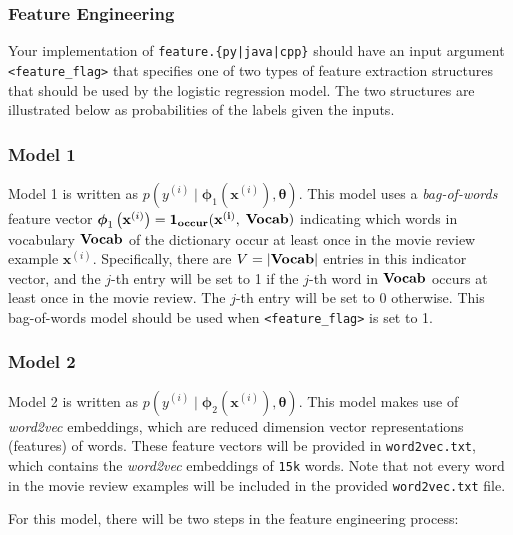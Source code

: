 \documentclass[11pt,addpoints,answers]{exam}
\newcommand{\xv}{\mathbf{x}}
\newcommand{\thetav     }{\boldsymbol \theta     }
\begin{document}
\subsubsection{Feature Engineering} \label{feature}

Your implementation of \texttt{feature.\{py|java|cpp\}} should have an input argument \texttt{<feature\_flag>} that specifies one of two types of feature extraction structures that should be used by the logistic regression model. The two structures are illustrated below as probabilities of the labels given the inputs.

\subsubsection{Model 1}

Model 1 is written as $p\left(y^{(i)} \mid \boldsymbol{\phi}_1\left(\xv^{(i)}\right), \thetav\right)$. This model uses a \emph{bag-of-words} feature vector $\boldsymbol{\phi}_1\left(\xv^{(i)}\right) = \bf{1}_{occur}( \xv^{(i)},$ $\bf{Vocab})$ indicating which words in vocabulary $\bf{Vocab}$ of the dictionary occur at least once in the movie review example $\xv^{(i)}$. Specifically, there are $V=|\bf{Vocab}|$ entries in this indicator vector, and the $j$-th entry will be set to 1 if the $j$-th word in $\bf{Vocab}$ occurs at least once in the movie review. The $j$-th entry will be set to 0 otherwise. This bag-of-words model should be used when \texttt{<feature\_flag>} is set to 1.
    
\subsubsection{Model 2}

Model 2 is written as $p\left(y^{(i)} \mid \boldsymbol{\phi}_2\left(\xv^{(i)}\right), \thetav\right)$. This model makes use of \emph{word2vec} embeddings, which are reduced dimension  vector representations (features) of words. These feature vectors will be provided in \texttt{word2vec.txt}, which contains the \emph{word2vec} embeddings of \texttt{15k} words. Note that not every word in the movie review examples will be included in the provided \texttt{word2vec.txt} file.
    
For this model, there will be two steps in the feature engineering process: 
    
\end{document}
